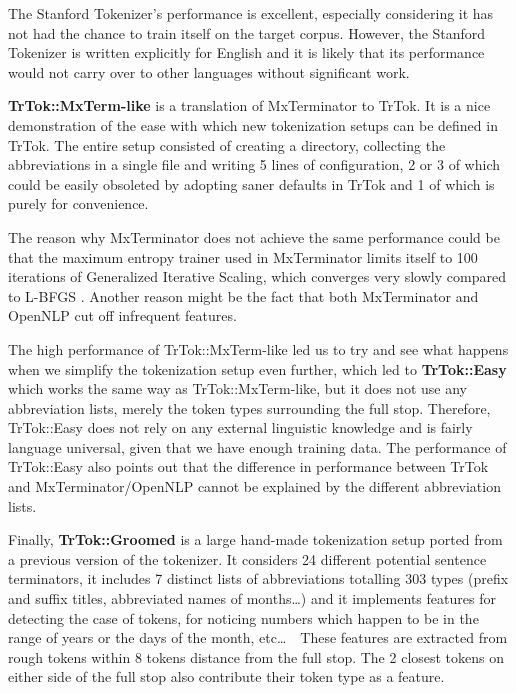 The Stanford Tokenizer's performance is excellent, especially
considering it has not had the chance to train itself on the target
corpus. However, the Stanford Tokenizer is written explicitly for
English and it is likely that its performance would not carry over to
other languages without significant work.

\textbf{TrTok::MxTerm-like} is a translation of MxTerminator to TrTok.
It is a nice demonstration of the ease with which new tokenization
setups can be defined in TrTok. The entire setup consisted of creating
a directory, collecting the abbreviations in a single file and writing
5 lines of configuration, 2 or 3 of which could be easily obsoleted by
adopting saner defaults in TrTok and 1 of which is purely for
convenience.

The reason why MxTerminator does not achieve the same performance
could be that the maximum entropy trainer used in MxTerminator limits
itself to 100 iterations of Generalized Iterative Scaling, which
converges very slowly compared to L-BFGS \cite{maxent-algorithms}.
Another reason might be the fact that both MxTerminator and OpenNLP
cut off infrequent features.

The high performance of TrTok::MxTerm-like led us to try and see what
happens when we simplify the tokenization setup even further, which
led to \textbf{TrTok::Easy} which works the same way as
TrTok::MxTerm-like, but it does not use any abbreviation lists, merely
the token types surrounding the full stop. Therefore, TrTok::Easy does
not rely on any external linguistic knowledge and is fairly language
universal, given that we have enough training data. The performance of
TrTok::Easy also points out that the difference in performance between
TrTok and MxTerminator/OpenNLP cannot be explained by the different
abbreviation lists.

Finally, \textbf{TrTok::Groomed} is a large hand-made
tokenization setup ported from a previous version of the tokenizer. It
considers 24 different potential sentence terminators, it includes 7
distinct lists of abbreviations totalling 303 types (prefix and suffix
titles, abbreviated names of months\ldots) and it implements features
for detecting the case of tokens, for noticing numbers which happen to
be in the range of years or the days of the month, etc\ldots\ \ These
features are extracted from rough tokens within 8 tokens distance from
the full stop. The 2 closest tokens on either side of the full stop
also contribute their token type as a feature.

